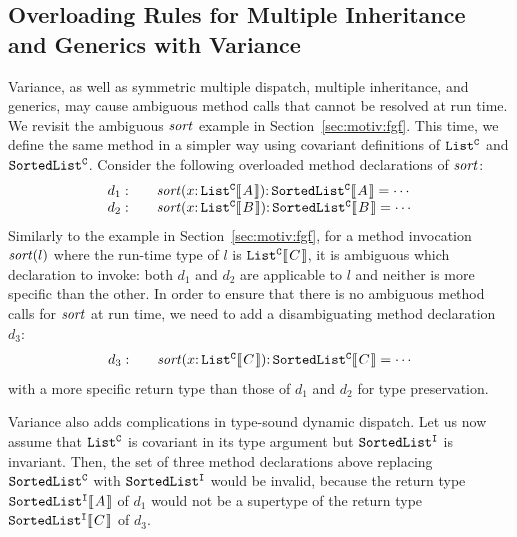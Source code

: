 \subsection{Overloading Rules for Multiple Inheritance and Generics with Variance}
\label{sec:motiv:fgfv}
Variance, as well as symmetric multiple dispatch, multiple inheritance,
and generics, may cause ambiguous method calls that cannot be resolved
at run time.  We revisit the ambiguous $\mbox{\textit{sort}}$ example in
Section~\ref{sec:motiv:fgf}.  This time, we define the same method
in a simpler way using covariant definitions of $\mathtt{List^C}$ and $\mathtt{SortedList^C}$.
Consider the following overloaded method declarations of $\mbox{\textit{sort}}$:
\[\begin{array}[ht]{r@{\qquad}l}
d_1:&\mbox{\textit{sort}}(x \COLON \kwd{List^C}\ob{A}) \COLON \kwd{SortedList^C}\ob{A} = \cdots\\
d_2:&\mbox{\textit{sort}}(x \COLON \kwd{List^C}\ob{B}) \COLON \kwd{SortedList^C}\ob{B} = \cdots\\
\end{array}\]
Similarly to the example in Section~\ref{sec:motiv:fgf}, for a method invocation
$\mbox{\textit{sort}}(l)$ where the run-time type of $l$ is $\kwd{List^C}\ob{C}$,
it is ambiguous which declaration to invoke: both $d_1$ and
$d_2$ are applicable to $l$ and neither is more specific than the other.
In order to ensure that there is no ambiguous method calls for
$\mbox{\textit{sort}}$ at run time, we need to add a disambiguating method
declaration $d_3$:
\[\begin{array}[ht]{r@{\qquad}l}
d_3:&\mbox{\textit{sort}}(x \COLON \kwd{List^C}\ob{C}) \COLON \kwd{SortedList^C}\ob{C} = \cdots\\
\end{array}\]
with a more specific return type than those of $d_1$ and $d_2$ for type
preservation.

Variance also adds complications in type-sound dynamic dispatch.  Let us now
assume that $\mathtt{List^C}$ is covariant in its type argument but
$\mathtt{SortedList^I}$ is invariant.
Then, the set of three method declarations above
replacing $\mathtt{SortedList^C}$ with $\mathtt{SortedList^I}$ would be invalid,
because the return type $\kwd{SortedList^I}\ob{A}$ of $d_1$ would not be a supertype of the return type $\kwd{SortedList^I}\ob{C}$ of $d_3$.


